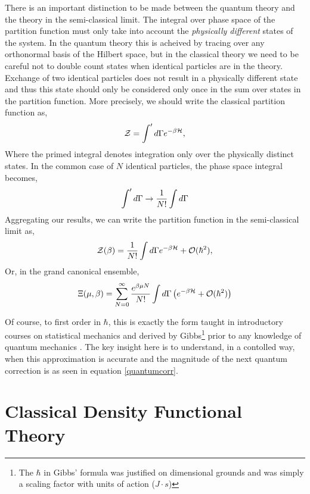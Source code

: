 There is an important distinction to be made between the quantum theory and the
theory in the semi-classical limit.  The integral over phase space of the
partition function must only take into account the \textit{physically
different} states of the system.  In the quantum theory this is acheived by
tracing over any orthonormal basis of the Hilbert space, but in the classical
theory we need to be careful not to double count states when identical
particles are in the theory.  Exchange of two identical particles does not
result in a physically different state and thus this state should only be
considered only once in the sum over states in the partition function.  More
precisely, we should write the classical partition function as,
%
\begin{equation} \mathcal{Z} = \int^\prime d\Gamma e^{-\beta \mathcal{H}}, \end{equation}
%
Where the primed integral denotes integration only over the physically distinct
states. In the common case of $N$ identical particles, the phase space integral
becomes, 
%
\begin{equation} \int^\prime d\Gamma \rightarrow \frac{1}{N!}\int d\Gamma
\end{equation}
%
Aggregating our results, we can write the partition function in the
semi-classical limit as,
%
\begin{equation}
    \mathcal{Z}(\beta) = \frac{1}{N!}\int d\Gamma e^{-\beta \mathcal{H}} + \mathcal{O}(\hbar ^ 2),
\end{equation}
%
Or, in the grand canonical ensemble,
%
\begin{equation} 
    \Xi(\mu, \beta) = \sum_{N = 0}^\infty \frac{e^{\beta\mu N}}{N!}
        \int d\Gamma \left( e^{-\beta \mathcal{H}} + \mathcal{O}(\hbar^2)\right)
\end{equation}

Of course, to first order in $\hbar$, this is exactly the form taught in
introductory courses on statistical mechanics and derived by Gibbs\footnote{The
$\hbar$ in Gibbs' formula was justified on dimensional grounds and was simply a
scaling factor with units of action ($J\cdot s$)} prior to any knowledge of
quantum mechanics \cite{Gibbs}.  The key insight here is to understand, in a
contolled way, when this approximation is accurate and the magnitude of the next
quantum correction is as seen in equation \ref{quantumcorr}.

\section{Classical Density Functional Theory}  %

